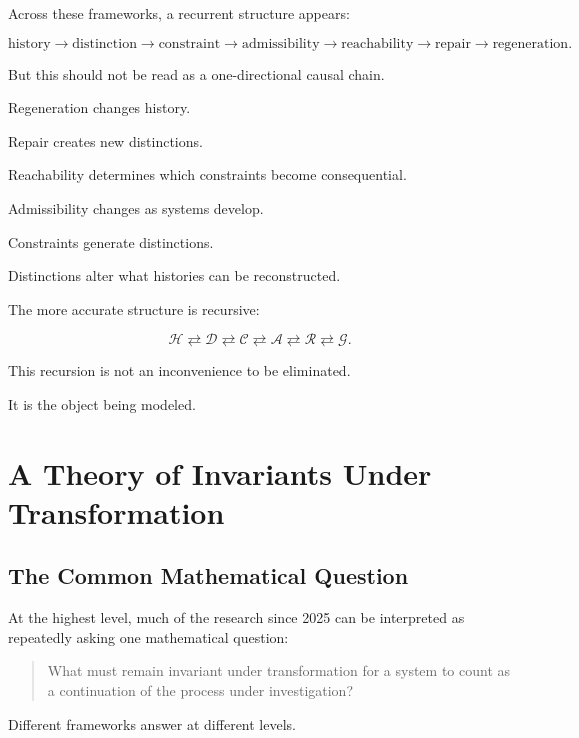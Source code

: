 \documentclass[11pt]{article}
\theoremstyle{remark}
\begin{document}
Across these frameworks, a recurrent structure appears:

\begin{equation}
\boxed{
\text{history}
\rightarrow
\text{distinction}
\rightarrow
\text{constraint}
\rightarrow
\text{admissibility}
\rightarrow
\text{reachability}
\rightarrow
\text{repair}
\rightarrow
\text{regeneration}.
}
\end{equation}

But this should not be read as a one-directional causal chain.

Regeneration changes history.

Repair creates new distinctions.

Reachability determines which constraints become consequential.

Admissibility changes as systems develop.

Constraints generate distinctions.

Distinctions alter what histories can be reconstructed.

The more accurate structure is recursive:

\begin{equation}
\mathcal{H}
\rightleftarrows
\mathcal{D}
\rightleftarrows
\mathcal{C}
\rightleftarrows
\mathcal{A}
\rightleftarrows
\mathcal{R}
\rightleftarrows
\mathcal{G}.
\end{equation}

This recursion is not an inconvenience to be eliminated.

It is the object being modeled.

\section{A Theory of Invariants Under Transformation}

\subsection{The Common Mathematical Question}

At the highest level, much of the research since 2025 can be interpreted as repeatedly asking one mathematical question:

\begin{quote}
What must remain invariant under transformation for a system to count as a continuation of the process under investigation?
\end{quote}

Different frameworks answer at different levels.
\end{document}
